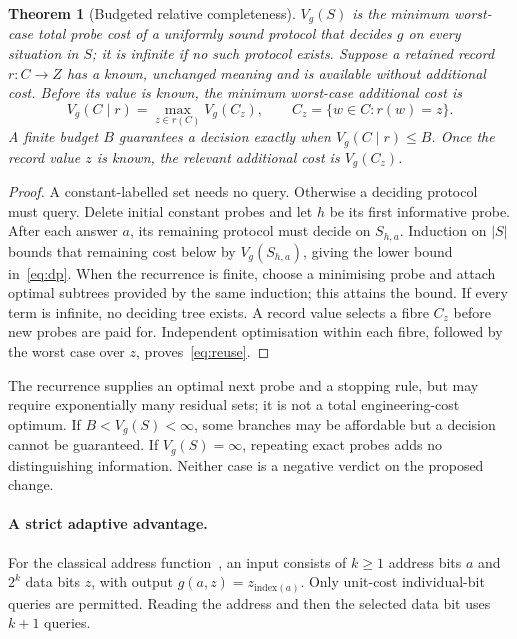 \documentclass[11pt,letterpaper]{article}
\newtheorem{theorem}{Theorem}
\begin{document}
\begin{theorem}[Budgeted relative completeness]
\label{thm:budget}
$V_g(S)$ is the minimum worst-case total probe cost of a uniformly sound protocol that decides $g$ on every situation in $S$; it is infinite if no such protocol exists. Suppose a retained record $r:C\to Z$ has a known, unchanged meaning and is available without additional cost. Before its value is known, the minimum worst-case additional cost is
\begin{equation}
 V_g(C\mid r)=\max_{z\in r(C)}V_g(C_z),
 \qquad C_z=\{w\in C:r(w)=z\}.
 \label{eq:reuse}
\end{equation}
A finite budget $B$ guarantees a decision exactly when $V_g(C\mid r)\le B$. Once the record value $z$ is known, the relevant additional cost is $V_g(C_z)$.
\end{theorem}
\begin{proof}
A constant-labelled set needs no query. Otherwise a deciding protocol must query. Delete initial constant probes and let $h$ be its first informative probe. After each answer $a$, its remaining protocol must decide on $S_{h,a}$. Induction on $|S|$ bounds that remaining cost below by $V_g(S_{h,a})$, giving the lower bound in~\eqref{eq:dp}. When the recurrence is finite, choose a minimising probe and attach optimal subtrees provided by the same induction; this attains the bound. If every term is infinite, no deciding tree exists. A record value selects a fibre $C_z$ before new probes are paid for. Independent optimisation within each fibre, followed by the worst case over $z$, proves~\eqref{eq:reuse}.
\end{proof}

The recurrence supplies an optimal next probe and a stopping rule, but may require exponentially many residual sets; it is not a total engineering-cost optimum. If $B<V_g(S)<\infty$, some branches may be affordable but a decision cannot be guaranteed. If $V_g(S)=\infty$, repeating exact probes adds no distinguishing information. Neither case is a negative verdict on the proposed change.

\paragraph{A strict adaptive advantage.}
For the classical address function~\cite{trees}, an input consists of $k\ge1$ address bits $a$ and $2^k$ data bits $z$, with output $g(a,z)=z_{\mathrm{index}(a)}$. Only unit-cost individual-bit queries are permitted. Reading the address and then the selected data bit uses $k+1$ queries.
\end{document}
